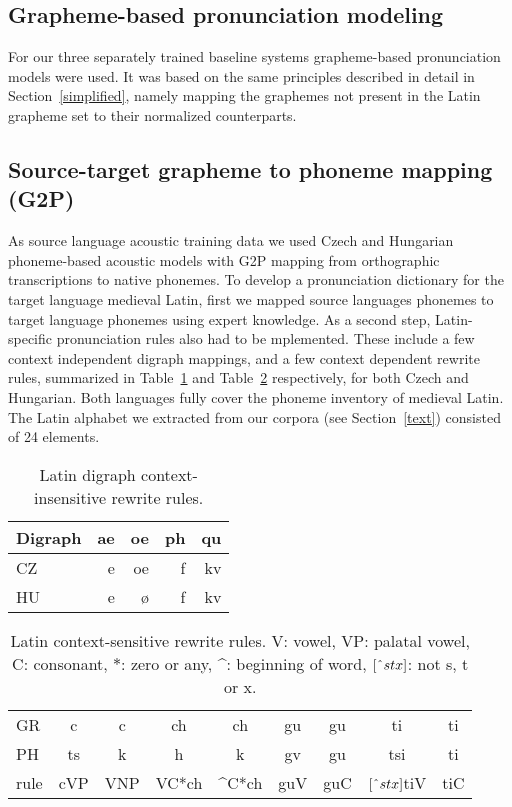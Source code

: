 \documentclass[runningheads,a4paper]{llncs}
\begin{document}
\subsection{Grapheme-based pronunciation modeling}\label{baseline}
For our three separately trained baseline systems grapheme-based pronunciation models were used.
It was based on the same principles described in detail in Section~\ref{simplified}, namely mapping the graphemes not present in the Latin grapheme set to their normalized counterparts.
\subsection{Source-target grapheme to phoneme mapping (G2P)}\label{g2p}
As source language acoustic training data we used Czech and Hungarian phoneme-based acoustic models with G2P mapping from orthographic transcriptions to native phonemes.
To develop a pronunciation dictionary for the target language medieval Latin, first we mapped source languages phonemes to target language phonemes using expert knowledge.
As a second step, Latin-specific pronunciation rules also had to be mplemented.
These include a few context independent digraph mappings, and a few context dependent rewrite rules, summarized in Table~\ref{tbl:digraph} and Table~\ref{tbl:context} respectively, for both Czech and Hungarian.
Both languages fully cover the phoneme inventory of medieval Latin.
The Latin alphabet we extracted from our corpora (see Section~\ref{text}) consisted of 24 elements.

\begin{table}
	\centering
	\caption{Latin digraph context-insensitive rewrite rules.}\label{tbl:digraph}
	\begin{tabular}{l|rrrr}
	\hline
	Digraph & ae & oe & ph & qu \\
	\hline
	CZ & e & oe & f & kv \\
	HU & e & \o & f & kv \\
	\hline
	\end{tabular}
\end{table}

\begin{table}
	\centering
	\caption{Latin context-sensitive rewrite rules. V: vowel, VP: palatal vowel, C: consonant, $*$: zero or any, \string^: beginning of word, $[\string^stx]$: not s, t or x.}\label{tbl:context}
	\begin{tabular}{l|cc|cc|cc|cc}
	\hline
	GR & c & c & ch & ch & gu & gu & ti & ti \\
	PH & ts & k & h & k & gv & gu & tsi & ti \\
	\hline
	rule & \multicolumn{1}{c|}{cVP} & \multicolumn{1}{c|}{VNP} & \multicolumn{1}{c|}{VC*ch} & \multicolumn{1}{c|}{\string^C*ch} & \multicolumn{1}{c|}{guV} & \multicolumn{1}{c|}{guC} & \multicolumn{1}{c|}{$[\string^stx]$tiV} & \multicolumn{1}{c|}{tiC} \\
	\hline
	\end{tabular}
\end{table}
\end{document}

